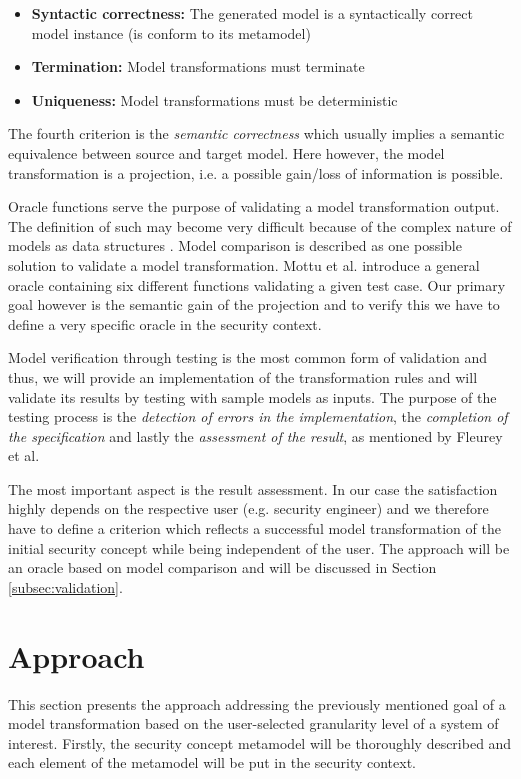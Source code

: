 \begin{itemize}
\item[]\textbf{Syntactic correctness:} The generated model is a syntactically correct model instance (is conform to its metamodel)
\item[]\textbf{Termination:} Model transformations must terminate
\item[]\textbf{Uniqueness:} Model transformations must be deterministic 
\end{itemize}

The fourth criterion is the \textit{semantic correctness} which usually implies a semantic equivalence between source and target model. Here however, the model transformation is a projection, i.e. a possible gain/loss of information is possible.  

Oracle functions serve the purpose of validating a model transformation output. The definition of such may become very difficult because of the complex nature of models as data structures \cite{mottu}. Model comparison is described as one possible solution to validate a model transformation. Mottu et al. introduce a general oracle containing six different functions validating a given test case. Our primary goal however is the semantic gain of the projection and to verify this we have to define a very specific oracle in the security context. 

Model verification through testing is the most common form of validation \cite{fleurey} and thus, we will provide an implementation of the transformation rules and will validate its results by testing with sample models as inputs. The purpose of the testing process is the \textit{detection of errors in the implementation}, the \textit{completion of the specification} and lastly the \textit{assessment of the result}, as mentioned by Fleurey et al.

The most important aspect is the result assessment. In our case the satisfaction highly depends on the respective user (e.g. security engineer) and we therefore have to define a criterion which reflects a successful model transformation of the initial security concept while being independent of the user. The approach will be an oracle based on model comparison and will be discussed in Section \ref{subsec:validation}.
 
\section{Approach}
This section presents the approach addressing the previously mentioned goal of a model transformation based on the user-selected granularity level of a system of interest. Firstly, the security concept metamodel will be thoroughly described and each element of the metamodel will be put in the security context.

